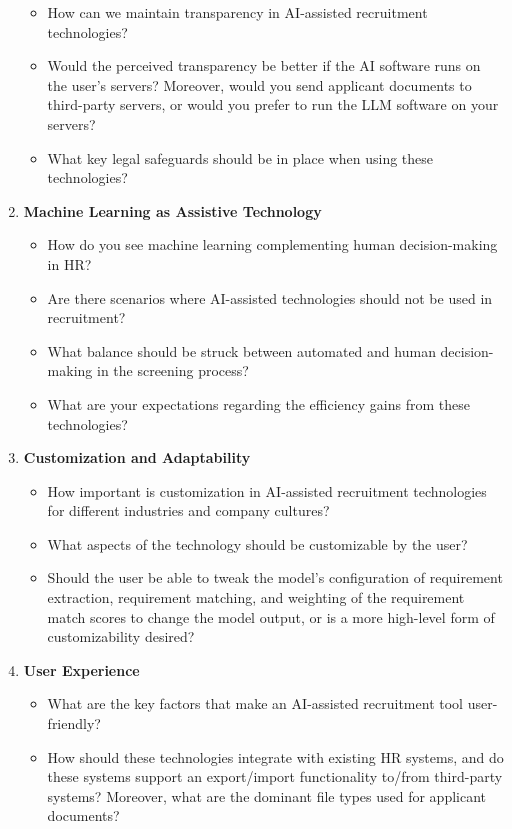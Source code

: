 \documentclass[draft,final]{thesisclass} %
\begin{document}
\begin{enumerate}
\begin{itemize}
        \item How can we maintain transparency in \acs{AI}-assisted recruitment technologies? 
        \item Would the perceived transparency be better if the \acs{AI} software runs on the user's servers? Moreover, would you send applicant documents to third-party servers, or would you prefer to run the \acs{LLM} software on your servers?
        \item What key legal safeguards should be in place when using these technologies?
    \end{itemize}
    \item \textbf{Machine Learning as Assistive Technology}
    \begin{itemize}
        \item How do you see machine learning complementing human decision-making in \acs{HR}?
        \item Are there scenarios where \acs{AI}-assisted technologies should not be used in recruitment?
        \item What balance should be struck between automated and human decision-making in the screening process?
        \item What are your expectations regarding the efficiency gains from these technologies?
    \end{itemize}
    \item \textbf{Customization and Adaptability}
    \begin{itemize}
        \item How important is customization in \acs{AI}-assisted recruitment technologies for different industries and company cultures?
        \item What aspects of the technology should be customizable by the user?
        \item Should the user be able to tweak the model's configuration of requirement extraction, requirement matching, and weighting of the requirement match scores to change the model output, or is a more high-level form of customizability desired?
    \end{itemize}
    \item \textbf{User Experience}
    \begin{itemize}
        \item What are the key factors that make an \acs{AI}-assisted recruitment tool user-friendly?
        \item How should these technologies integrate with existing \acs{HR} systems, and do these systems support an export/import functionality to/from third-party systems? Moreover, what are the dominant file types used for applicant documents?

\end{itemize}
\end{enumerate}
\end{document}
